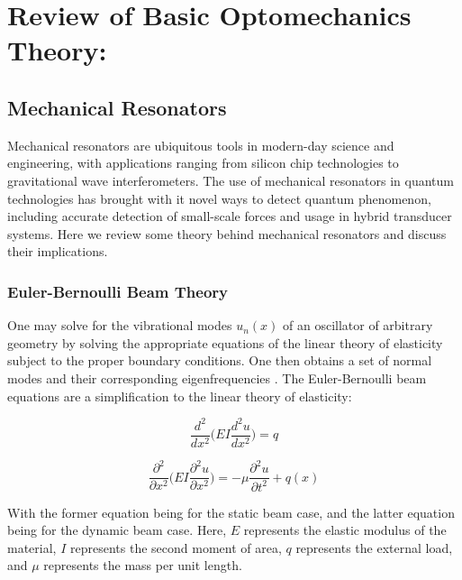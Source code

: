 \documentclass[%
 reprint,
nofootinbib,
 amsmath,amssymb,
 aps,
]{revtex4-2}
\begin{document}
\section{\label{sec:level1}Review of Basic Optomechanics Theory:}

\subsection{Mechanical Resonators}

Mechanical resonators are ubiquitous tools in modern-day science and engineering, with applications ranging from silicon chip technologies to gravitational wave interferometers. The use of mechanical resonators in quantum technologies has brought with it novel ways to detect quantum phenomenon, including accurate detection of small-scale forces and usage in hybrid transducer systems. Here we review some theory behind mechanical resonators and discuss their implications.

\subsubsection{Euler-Bernoulli Beam Theory}
One may solve for the vibrational modes $u_{n}(x)$ of an oscillator of arbitrary geometry by solving the appropriate equations of the linear theory of elasticity subject to the proper boundary conditions. One then obtains a set of normal modes and their corresponding eigenfrequencies \cite{cavity_optomechanics_2014}. The Euler-Bernoulli beam equations are a simplification to the linear theory of elasticity:

\begin{equation*}   %
    \frac{d^2}{dx^2} \Big( EI \frac{d^2u}{dx^2} \Big) = q
\end{equation*}


\begin{equation*}   %
    \frac{\partial^2}{\partial x^2} \Big( EI \frac{\partial^2u}{\partial x^2} \Big) = -\mu \frac{\partial^2 u}{\partial t^2} + q(x)
\end{equation*}

With the former equation being for the static beam case, and the latter equation being for the dynamic beam case. Here, $E$ represents the elastic modulus of the material, $I$ represents the second moment of area, $q$ represents the external load, and $\mu$ represents the mass per unit length.
\end{document}

